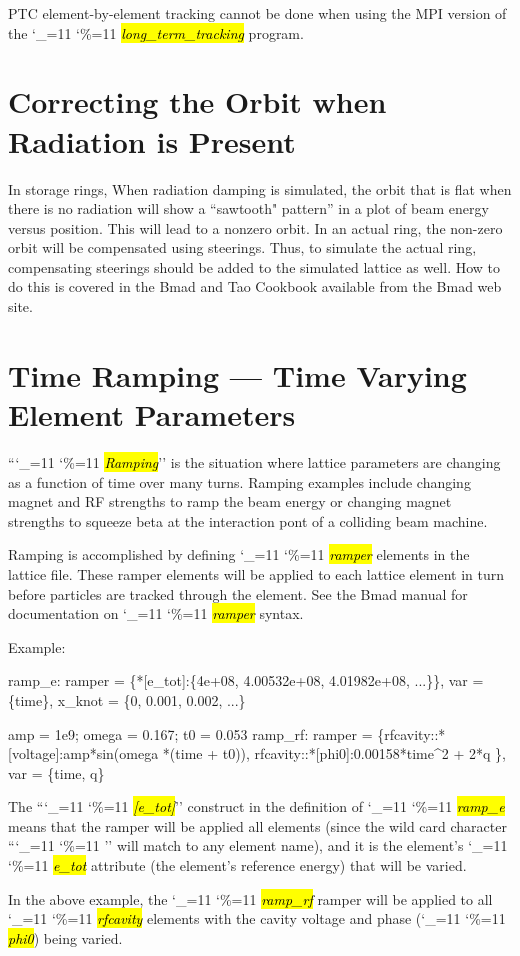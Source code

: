 \documentclass{hitec}
\newcommand\dottcmd[1]{\hl{\em#1}\endgroup}
\newcommand{\vn}{\begingroup\catcode`\_=11 \catcode`\%=11 \dottcmd}
\newcommand{\ltt}{\vn{long_term_tracking}\xspace}
\newcommand{\Section}[1]{\section{#1}\vspace*{-1ex}}
\begin{document}
{{{{{{{{{{{{PTC element-by-element tracking cannot be done when using the MPI version of the \ltt program.

\Section{Correcting the Orbit when Radiation is Present}

In storage rings, When radiation damping is simulated, the orbit that is flat when there is no
radiation will show a ``sawtooth" pattern'' in a plot of beam energy versus position. This will lead
to a nonzero orbit. In an actual ring, the non-zero orbit will be compensated using steerings. Thus,
to simulate the actual ring, compensating steerings should be added to the simulated lattice as
well. How to do this is covered in the Bmad and Tao Cookbook available from the Bmad web site.

\Section{Time Ramping --- Time Varying Element Parameters}
\label{s:ramp}

``\vn{Ramping}'' is the situation where lattice parameters are changing as a function of time over
many turns. Ramping examples include changing magnet and RF strengths to ramp the beam energy or
changing magnet strengths to squeeze beta at the interaction pont of a colliding beam machine.

Ramping is accomplished by defining \vn{ramper} elements in the lattice file. These ramper elements
will be applied to each lattice element in turn before particles are tracked through the
element. See the Bmad manual for documentation on \vn{ramper} syntax.

Example:
\begin{code}
ramp_e: ramper = \{*[e_tot]:\{4e+08, 4.00532e+08, 4.01982e+08, ...\}\},
              var = \{time\}, x_knot = \{0, 0.001, 0.002, ...\}

amp = 1e9;  omega = 0.167;  t0 = 0.053
ramp_rf: ramper = \{rfcavity::*[voltage]:amp*sin(omega *(time + t0)),
      rfcavity::*[phi0]:0.00158*time^2 + 2*q \}, var = \{time, q\}
\end{code}
The ``\vn{*[e_tot]}'' construct in the definition of \vn{ramp_e} means that the ramper will be
applied all elements (since the wild card character ``\vn{*}'' will match to any element name), and
it is the element's \vn{e_tot} attribute (the element's reference energy) that will be varied.

In the above example, the \vn{ramp_rf} ramper will be applied to all \vn{rfcavity} elements with
the cavity voltage and phase (\vn{phi0}) being varied.

}}}}}}}}}}}}
\end{document}
